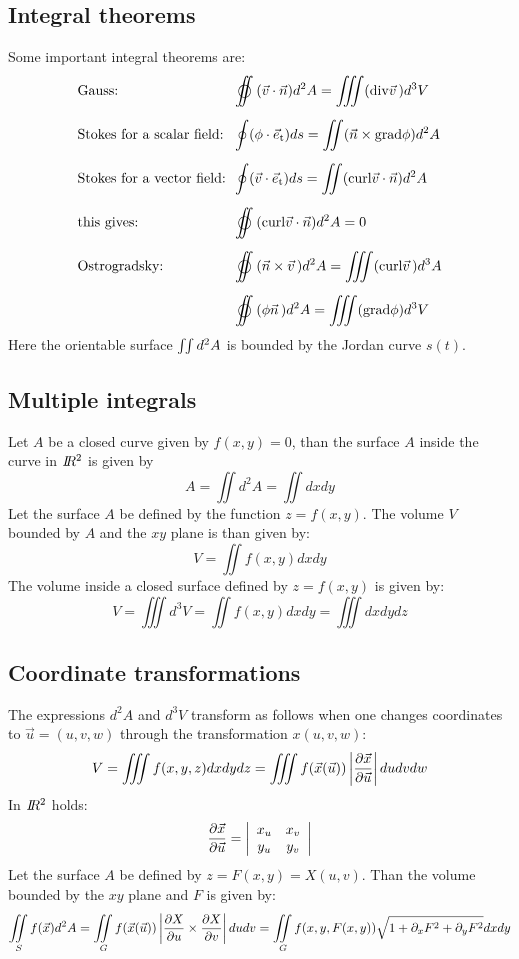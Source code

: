 \documentclass[a4paper,fancyheadings,twoside]{report}
\begin{document}
\subsection{Integral theorems}
Some important integral theorems are:
\[
\begin{array}{l@{~~}l}
\mbox{Gauss:}&\displaystyle\oiint(\vec{v}\cdot\vec{n})d^2A=\iiint({\rm div}\vvec{v})d^3V\\[5mm]
\mbox{Stokes for a scalar field:}&\displaystyle\oint(\phi\cdot\e{t})ds=\iint(\vec{n}\times{\rm grad}\phi)d^2A\\[5mm]
\mbox{Stokes for a vector field:}&\displaystyle\oint(\vec{v}\cdot\e{t})ds=\iint({\rm curl}\vec{v}\cdot\vec{n})d^2A\\[5mm]
\mbox{this gives:}&\displaystyle\oiint({\rm curl}\vec{v}\cdot\vec{n})d^2A=0\\[5mm]
\mbox{Ostrogradsky:}&\displaystyle\oiint(\vec{n}\times\vvec{v})d^2A=\iiint({\rm curl}\vvec{v})d^3A\\[5mm]
\mbox{}&\displaystyle\oiint(\phi\vvec{n})d^2A=\iiint({\rm grad}\phi)d^3V
\end{array}
\]
Here the orientable surface $\int\hspace{-1mm}\int d^2A$ is bounded by the
Jordan curve $s(t)$.

\subsection{Multiple integrals}
Let $A$ be a closed curve given by $f(x,y)=0$, than the surface $A$ inside
the curve in $I\hspace{-1mm}R^2$ is given by
\[
A=\iint d^2A=\iint dxdy
\]
Let the surface $A$ be defined by the function $z=f(x,y)$. The volume $V$
bounded by $A$ and the $xy$ plane is than given by:
\[
V=\iint f(x,y)dxdy
\]
The volume inside a closed surface defined by $z=f(x,y)$ is given by:
\[
V=\iiint d^3V=\iint f(x,y)dxdy=\iiint dxdydz
\]

\subsection{Coordinate transformations}
The expressions $d^2A$ and $d^3V$ transform as follows when one changes
coordinates to $\vec{u}=(u,v,w)$ through the transformation $x(u,v,w)$:
\[
V=\iiint f(x,y,z)dxdydz=\iiint f(\vec{x}(\vec{u}))\left|\Q{\vec{x}}{\vec{u}}\right|dudvdw
\]
In $I\hspace{-1mm}R^2$ holds:
\[
\frac{\partial \vec{x}}{\partial \vec{u}}=\left|\begin{array}{cc}x_u&x_v\\ y_u&y_v\end{array}\right|
\]
Let the surface $A$ be defined by $z=F(x,y)=X(u,v)$. Than the volume bounded by
the $xy$ plane and $F$ is given by:
\[
\int\hspace{-1.5ex}\int\limits_Sf(\vec{x})d^2A=\int\hspace{-1.5ex}\int\limits_Gf(\vec{x}(\vec{u}))
\left|\frac{\partial X}{\partial u}\times\frac{\partial X}{\partial v}\right|dudv=
\int\hspace{-1.5ex}\int\limits_Gf(x,y,F(x,y))\sqrt{1+\partial_xF^2+\partial_yF^2}dxdy
\]
\end{document}
